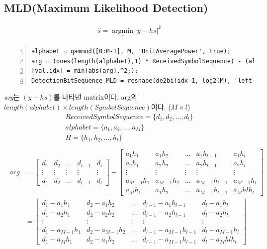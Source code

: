 \documentclass{article}
\providecommand{\abs}[1]{\lvert#1\rvert}
\begin{document}
\subsection{MLD(Maximum Likelihood Detection)}
\begin{gather}
\hat{s}=\operatorname*{argmin}_s \abs{y-hs}^2
\end{gather}
\begin{lstlisting}[style=Matlab-editor, frame=single, numbers=left,]
alphabet = qammod([0:M-1], M, 'UnitAveragePower', true);
arg = (ones(length(alphabet),1) * ReceivedSymbolSequence) - (alphabet.' * H);
[val,idx] = min(abs(arg).^2;);
DetectionBitSequence_MLD = reshape(de2bi(idx-1, log2(M), 'left-msb')', 1, []);
\end{lstlisting}
\textsl{arg}는 $(y-hs)$를 나타낸 matrix이다. arg의 $length(alphabet)\times length(SymbolSequence)$이다. ($M \times l$)
\begin{gather}
ReceivedSymbolSequence=\{d_1, d_2, ..., d_l\}\\
alphabet=\{a_1, a_2, ..., a_M\}\\
H=\{h_1, h_2, ..., h_l\}\\
\end{gather}
\begin{gather}
	\begin{split}
		arg &=
		\begin{bmatrix}
		d_1 & d_2 & ... & d_{l-1} & d_l\\
		\vdots & \vdots & \vdots & \vdots & \vdots \\
		d_1 & d_2 & ... & d_{l-1} & d_l
		\end{bmatrix}
		- 
		\begin{bmatrix}
		a_{1}h_{1} & a_{1}h_{2} & ... & a_{1}h_{l-1} & a_{1}h_{l}\\
		a_{2}h_{1} & a_{2}h_{2} & ... & a_{2}h_{l-1} & a_{2}h_{l}\\
		\vdots & \vdots & \vdots & \vdots & \vdots \\
		a_{M-1}h_{1} & a_{M-1}h_{2} & ... & a_{M-1}h_{l-1} & a_{M-1}h_{l}\\
		a_{M}h_{1} & a_{1}h_{2} & ... & a_{M-1}h_{l-1} & a_{M}h{l}h_{l}
		\end{bmatrix}\\
		&=
		\begin{bmatrix}
		d_1-a_{1}h_{1} & d_2-a_{1}h_{2} & ... & d_{l-1}-a_{1}h_{l-1} & d_{l}-a_{1}h_{l}\\
		d_1-a_{2}h_{1} & d_2-a_{2}h_{2} & ... & d_{l-1}-a_{2}h_{l-1} & d_{l}-a_{2}h_{l}\\
		\vdots & \vdots & \vdots & \vdots & \vdots \\
		d_1-a_{M-1}h_{1} & d_2-a_{M-1}h_{2} & ... & d_{l-1}-a_{M-1}h_{l-1} & d_{l}-a_{M-1}h_{l}\\
		d_1-a_{M}h_{1} & d_2-a_{1}h_{2} & ... & d_{l-1}-a_{M-1}h_{l-1} & d_{l}-a_{M}h{l}h_{l}
		\end{bmatrix}\\
	\end{split}
\end{gather}
\end{document}
